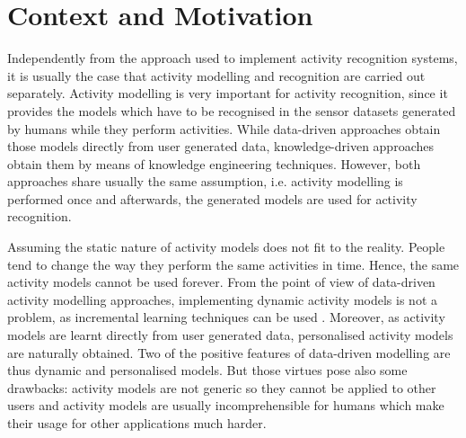 \section{Context and Motivation}
\label{sec:intro:context}



Independently from the approach used to implement activity recognition systems, it is usually the case that activity modelling and recognition are carried out separately. Activity modelling is very important for activity recognition, since it provides the models which have to be recognised in the sensor datasets generated by humans while they perform activities. While data-driven approaches obtain those models directly from user generated data, knowledge-driven approaches obtain them by means of knowledge engineering techniques. However, both approaches share usually the same assumption, i.e. activity modelling is performed once and afterwards, the generated models are used for activity recognition. 


Assuming the static nature of activity models does not fit to the reality. People tend to change the way they perform the same activities in time. Hence, the same activity models cannot be used forever. From the point of view of data-driven activity modelling approaches, implementing dynamic activity models is not a problem, as incremental learning techniques can be used \cite{Rashidi2011}. Moreover, as activity models are learnt directly from user generated data, personalised activity models are naturally obtained. Two of the positive features of data-driven modelling are thus dynamic and personalised models. But those virtues pose also some drawbacks: activity models are not generic so they cannot be applied to other users and activity models are usually incomprehensible for humans which make their usage for other applications much harder.

